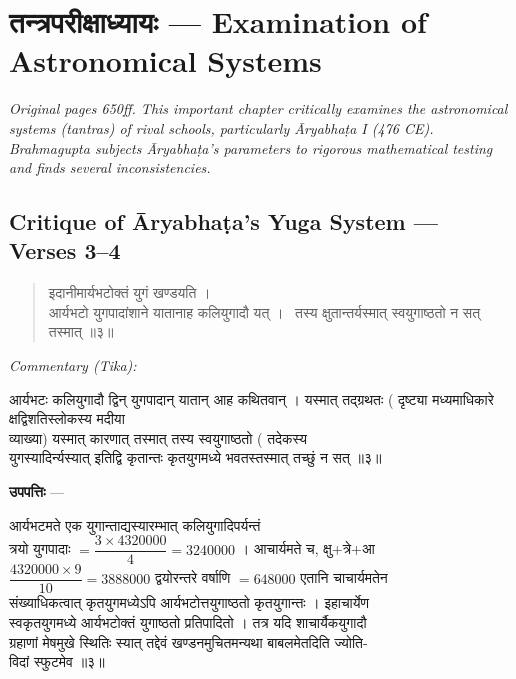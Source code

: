 \documentclass[11pt,a4paper]{article}
\newcommand{\dev}[1]{{\devanagarifont #1}}
\newcommand{\skt}[1]{{\devanagarifont\color{sktcolor} #1}}
\newenvironment{shloka}{%
  \begin{quote}%
  \smallskip%
  \devanagarifont\color{sktcolor}%
}{%
  \smallskip%
  \end{quote}%
}
\newenvironment{tika}{%
  \smallskip%
  \noindent\textit{Commentary (Tika):}\par%
  \smallskip%
  \hindifont\small%
}{%
  \par\smallskip%
}
\newenvironment{upapatti}{%
  \smallskip%
  \noindent\textbf{\devanagarifont उपपत्तिः} — \devanagarifont\small%
}{%
  \par\smallskip%
}
\newcommand{\ednote}[1]{\textcolor{notecolor}{\textit{#1}}}
\begin{document}
\newpage
\section[तन्त्रपरीक्षाध्यायः]{\dev{तन्त्रपरीक्षाध्यायः} — Examination of Astronomical Systems}
\label{sec:tantrapariksha}

\ednote{Original pages 650ff. This important chapter critically examines the astronomical systems (tantras) of rival schools, particularly Āryabhaṭa I (476 CE). Brahmagupta subjects Āryabhaṭa's parameters to rigorous mathematical testing and finds several inconsistencies.}

\subsection*{Critique of Āryabhaṭa's Yuga System — Verses 3--4}

\begin{shloka}
\skt{इदानीमार्यभटोक्तं युगं खण्डयति ।}\\[0.5em]
\skt{आर्यभटो युगपादांशाने यातानाह कलियुगादौ यत् ।}\
\skt{तस्य क्षुतान्तर्यस्मात् स्वयुगाष्ठतो न सत् तस्मात्} ॥३॥
\end{shloka}

\vspace{0.3cm}
\begin{tika}
\skt{आर्यभटः कलियुगादौ द्विन् युगपादान् यातान् आह कथितवान् । यस्मात् तद्ग्रथतः} (\skt{दृष्ट्या मध्यमाधिकारे क्षद्विशतिस्लोकस्य मदीया}\\
\skt{व्याख्या}) \skt{यस्मात् कारणात् तस्मात् तस्य स्वयुगाष्ठतो} (\skt{तदेकस्य}\\
\skt{युगस्यादिर्न्यस्यात् इतिद्वि कृतान्तः कृतयुगमध्ये भवतस्तस्मात् तच्छुं न सत्} ॥३॥
\end{tika}

\vspace{0.5cm}

\begin{upapatti}
\skt{आर्यभटमते एक युगान्ताद्यस्यारम्भात् कलियुगादिपर्यन्तं}\\
\skt{त्रयो युगपादाः} $= \dfrac{3 \times 4320000}{4} = 3240000$ । \skt{आचार्यमते च, क्षु+त्रे+आ}\\
$\dfrac{4320000 \times 9}{10} = 3888000$ \skt{द्वयोरन्तरे वर्षाणि} $= 648000$ \skt{एतानि चाचार्यमतेन}\\
\skt{संख्याधिकत्वात् कृतयुगमध्येऽपि आर्यभटोत्तयुगाष्ठतो कृतयुगान्तः । इहाचार्येण}\\
\skt{स्वकृतयुगमध्ये आर्यभटोक्तं युगाष्ठतो प्रतिपादितो । तत्र यदि शाचार्यैकयुगादौ}\\
\skt{ग्रहाणां मेषमुखे स्थितिः स्यात् तद्देवं खण्डनमुचितमन्यथा बाबलमेतदिति ज्योति-}\\
\skt{विदां स्फुटमेव} ॥३॥
\end{upapatti}
\end{document}
